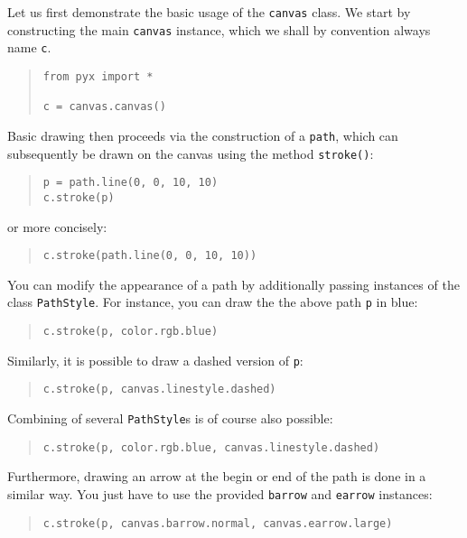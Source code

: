 Let us first demonstrate the basic usage of the \texttt{canvas} class.
We start by constructing the main \verb|canvas| instance, which we
shall by convention always name \verb|c|.
\begin{quote}
\begin{verbatim}
from pyx import *

c = canvas.canvas()
\end{verbatim}
\end{quote}
Basic drawing then proceeds via the construction of a \verb|path|, which 
can subsequently be drawn on the canvas using the method \verb|stroke()|:
\begin{quote}
\begin{verbatim}
p = path.line(0, 0, 10, 10)
c.stroke(p)
\end{verbatim}
\end{quote}
or more concisely:
\begin{quote}
\begin{verbatim}
c.stroke(path.line(0, 0, 10, 10))
\end{verbatim}
\end{quote}
You can modify the appearance of a path by additionally passing 
instances of the class \verb|PathStyle|. For instance, you can draw the 
the above path \verb|p| in blue:
\begin{quote}
\begin{verbatim}
c.stroke(p, color.rgb.blue)
\end{verbatim}
\end{quote}
Similarly, it is possible to draw a dashed version of \verb|p|:
\begin{quote}
\begin{verbatim}
c.stroke(p, canvas.linestyle.dashed)
\end{verbatim}
\end{quote}
Combining of several \verb|PathStyle|s is of course also possible:
\begin{quote}
\begin{verbatim}
c.stroke(p, color.rgb.blue, canvas.linestyle.dashed)
\end{verbatim}
\end{quote}
Furthermore, drawing an arrow at the begin or end of the path is done
in a similar way. You just have to use the provided \verb|barrow| and 
\verb|earrow| instances:
\begin{quote}
\begin{verbatim}
c.stroke(p, canvas.barrow.normal, canvas.earrow.large)
\end{verbatim}
\end{quote}

